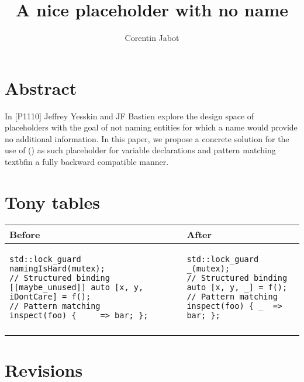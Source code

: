 \documentclass{wg21}
\title{A nice placeholder with no name}
\author{Corentin Jabot}{corentin.jabot@gmail.com}
\begin{document}
\maketitle


\section{Abstract}

In [P1110]\cite{P1110R0} Jeffrey Yesskin and JF Bastien explore the design space of placeholders
with the goal of not naming entities for which a name would provide no additional information.
In this paper, we propose a concrete solution for the use of \tcode{_} () as such placeholder 
for variable declarations and pattern matching textbf{in a fully backward compatible manner}.

\section{Tony tables}
\begin{center}
\begin{tabular}{l|l}
Before & After\\ \hline

\begin{minipage}[t]{0.5\textwidth}
\begin{lstlisting}[style=color]
std::lock_guard namingIsHard(mutex);
// Structured binding
[[maybe_unused]] auto [x, y, iDontCare] = f();
// Pattern matching
inspect(foo) { __  => bar; };

\end{lstlisting}
\end{minipage}
&
\begin{minipage}[t]{0.5\textwidth}
\begin{lstlisting}[style=color]
std::lock_guard _(mutex);
// Structured binding
auto [x, y, _] = f();
// Pattern matching
inspect(foo) { _  => bar; };

\end{lstlisting}
\end{minipage}
\\\\ \hline

\end{tabular}
\end{center}

\section{Revisions}
\end{document}
